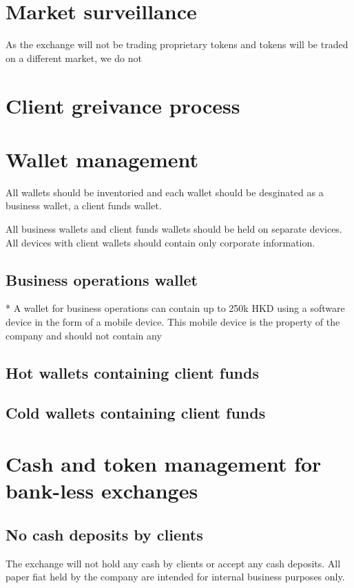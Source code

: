\section{Market surveillance}

As the exchange will not be trading proprietary tokens and tokens will
be traded on a different market, we do not 

\section{Client greivance process}
\section{Wallet management}
All wallets should be inventoried and each wallet should be desginated
as a business wallet, a client funds wallet.

All business wallets and client funds wallets should be held on
separate devices.  All devices with client wallets should contain only
corporate information.

\subsection{Business operations wallet}

* A wallet for business operations can contain up to 250k HKD using a
software device in the form of a mobile device.  This mobile device is
the property of the company and should not contain any


\subsection{Hot wallets containing client funds}

\subsection{Cold wallets containing client funds}

\section{Cash and token management for bank-less exchanges}

\subsection{No cash deposits by clients}
The exchange will not hold any cash by clients or accept any cash
deposits.  All paper fiat held by the company are intended for
internal business purposes only.

